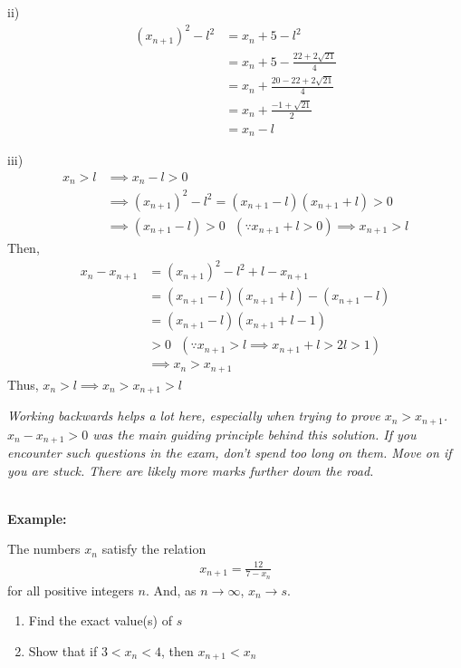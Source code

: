 \documentclass[12pt, a4paper, titlepage]{article}
\begin{document}
ii)
\begin{align*}
    (x_{n + 1})^2 - l^2 &= x_n + 5 - l^2 \\
    &= x_n + 5 - \frac{22 + 2\sqrt{21}}{4} \\
    &= x_n + \frac{20 - 22 + 2\sqrt{21}}{4} \\
    &= x_n + \frac{-1 + \sqrt{21}}{2} \\
    &= x_n - l
\end{align*}

iii)
\begin{align*}
    x_n > l &\implies x_n - l > 0 \\
    &\implies (x_{n + 1})^2 - l^2 = (x_{n + 1} - l)(x_{n + 1} + l) > 0 \\
    &\implies (x_{n + 1} - l) > 0 \text{ } (\because x_{n + 1} + l > 0) \implies x_{n + 1} > l
\end{align*}
Then,
\begin{align*}
    x_n - x_{n + 1} &= (x_{n + 1})^2 - l^2 + l - x_{n + 1} \\
    &= (x_{n + 1} - l)(x_{n + 1} + l) - (x_{n + 1} - l) \\
    &= (x_{n + 1} - l)(x_{n + 1} + l - 1) \\
    &> 0 \text{ }(\because x_{n + 1} > l \implies x_{n + 1} + l > 2l > 1) \\
    &\implies x_n > x_{n + 1}
\end{align*}
Thus, $x_n > l \implies x_n > x_{n + 1} > l$

\emph{Working backwards helps a lot here, especially when trying to prove $x_n > x_{n + 1}$. $x_n - x_{n + 1} > 0$ was the main guiding principle behind this solution. If you encounter such questions in the exam, don't spend too long on them. Move on if you are stuck. There are likely more marks further down the road.}

\textbf{\\ Example:}

The numbers $x_n$ satisfy the relation
\begin{align*}
    x_{n + 1} = \frac{12}{7 - x_n}
\end{align*}
for all positive integers $n$. And, as $n \rightarrow \infty$, $x_n \rightarrow s$.
\begin{enumerate}[label=(\roman*)]
    \item Find the exact value(s) of $s$
    \item Show that if $3 < x_n < 4$, then $x_{n + 1} < x_n$
\end{enumerate}
\end{document}

